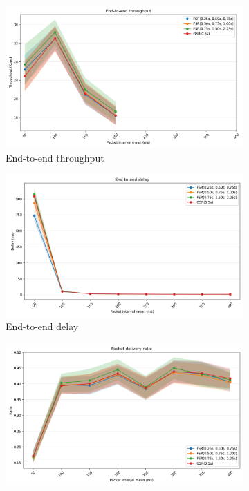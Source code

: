 \documentclass{winslabreport}
\begin{document}
\begin{figure}
    \centering
    \begin{subfigure}[b]{0.45\textwidth}
        \includegraphics[width=\textwidth]{../figures/sendInterval/end-to-end_throughput.png}
        \caption{End-to-end throughput}
        \label{fig:tput_send}
    \end{subfigure}
    \begin{subfigure}[b]{0.45\textwidth}
        \includegraphics[width=\textwidth]{../figures/sendInterval/end-to-end_delay.png}
        \caption{End-to-end delay}
        \label{fig:delay_send}
    \end{subfigure}
    \begin{subfigure}[b]{0.45\textwidth}
        \includegraphics[width=\textwidth]{../figures/sendInterval/packet_delivery_ratio.png}

\end{subfigure}
\end{figure}
\end{document}
